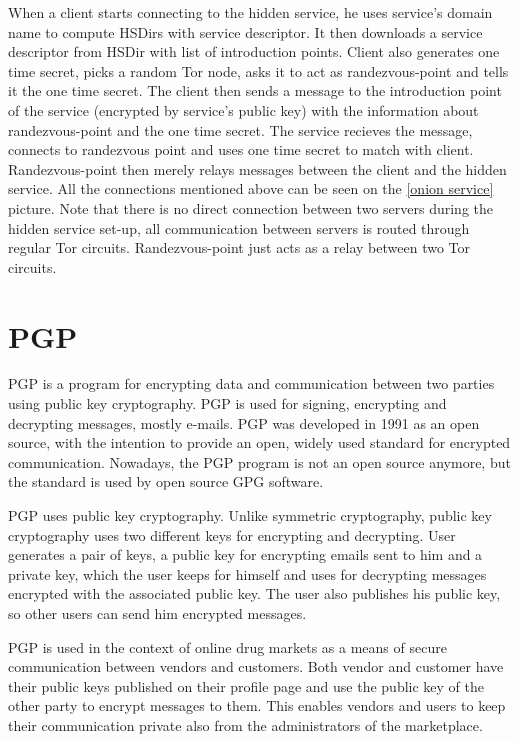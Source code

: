 \documentclass[
  digital, %
  table,   %
  lof,     %
  lot,     %
  oneside
]{fithesis3}
\begin{document}
When a client starts connecting to the hidden service, he uses service's domain name 
to compute HSDirs with service descriptor. It then downloads a service descriptor from HSDir with list
of introduction points. Client also generates one time secret, picks a random Tor node, asks
it to act as randezvous-point and tells it the one time secret. 
The client then sends a message to the introduction point of the service (encrypted by service's public key)
with the information about randezvous-point and the one time secret. The service recieves the message, connects 
to randezvous point and uses one time secret to match with client.
Randezvous-point then merely relays messages between the client and the hidden service.
All the connections mentioned above can be seen on the \ref{onion service} picture.
Note that there is no direct connection between two servers during the hidden service set-up,
all communication between servers is routed through regular Tor circuits.
Randezvous-point just acts as a relay between two Tor circuits.

\section{PGP}

PGP \cite{Zimmermann:1995:OPU:202735} is a program for encrypting data
and communication between two parties using public key cryptography.
PGP is used for signing, encrypting and decrypting messages, mostly e-mails.
PGP was developed in 1991 as an open source, with the intention 
to provide an open, widely used standard for encrypted communication.
Nowadays, the PGP program is not an open source anymore, but the standard is used by open source GPG software.

PGP uses public key cryptography. Unlike symmetric cryptography, public key cryptography
uses two different keys for encrypting and decrypting.
User generates a pair of keys, a public key for encrypting emails sent to him and a private key, which the user
 keeps for himself and uses for decrypting messages encrypted with the associated public key.
 The user also publishes his public key, so other users can send him encrypted messages.

PGP is used in the context of online drug markets as a means of secure communication between vendors and customers.
Both vendor and customer have their public keys published on their profile page and use the public key of the other
party to encrypt messages to them. This enables vendors and users to keep their communication private also from the administrators of the marketplace.
\end{document}

